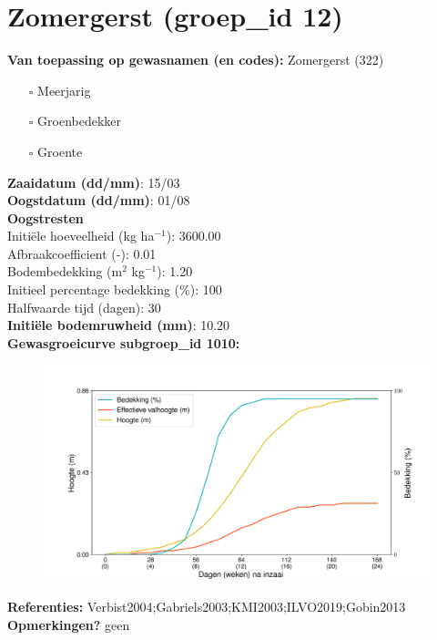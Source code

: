 \documentclass{article}
\begin{document}
 \section{Zomergerst (groep\_id 12)} 
 \textbf{Van toepassing op gewasnamen (en codes):} Zomergerst (322) 
 \begin{multicols}{3} \begin{itemize} \item[$\square$] Meerjarig \item[$\square$] Groenbedekker \item[$\square$] Groente \end{itemize} \end{multicols} 
  \textbf{Zaaidatum (dd/mm)}: 15/03  \vspace{0.10cm} \\ 
  \textbf{Oogstdatum (dd/mm)}: 01/08  \vspace{0.10cm} \\ 
  \textbf{Oogstresten} \vspace{0.05cm} \\ 
  \tab Initi\"{e}le hoeveelheid (kg ha$^{-1}$): 3600.00 \vspace{0.05cm} \\ 
  \tab Afbraakcoefficient (-): 0.01 \vspace{0.05cm} \\ 
  \tab Bodembedekking (m$^2$ kg$^{-1}$): 1.20 \vspace{0.05cm} \\ 
  \tab Initieel percentage bedekking (\%): 100 \vspace{0.05cm} \\ 
  \tab Halfwaarde tijd (dagen): 30 \vspace{0.05cm} \\ 
  \textbf{Initi\"{e}le bodemruwheid (mm)}: 10.20 \vspace{0.05cm} \\ 
  \textbf{Gewasgroeicurve subgroep\_id 1010:} 
 \begin{center} \begin{figure}[H] \includegraphics[width=12.5cm]{temp/1010.png} \end{figure} \end{center} 
  \textbf{Referenties:} Verbist2004;Gabriels2003;KMI2003;ILVO2019;Gobin2013 \vspace{0.10cm} \\ 
  \textbf{Opmerkingen?} geen \vspace{0.10cm} \\ 
 \newpage 
\end{document}
